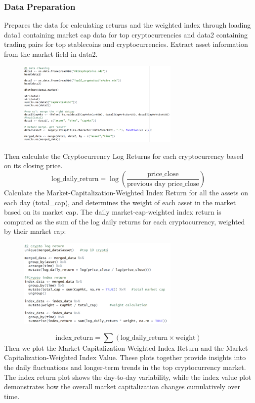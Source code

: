 \documentclass{article}
\begin{document}
\subsubsection{Data Preparation}
Prepares the data for calculating returns and the weighted index through loading data1 containing market cap data for top cryptocurrencies and data2 containing trading pairs for top stablecoins and cryptocurrencies. Extract asset information from the market field in data2.

\begin{figure}[h]
    \centering
    \includegraphics[width=0.7\textwidth]{2.png}
    \label{fig:example}
\end{figure}
Then calculate the Cryptocurrency Log Returns for each cryptocurrency based on its closing price.
\[
\text{log\_daily\_return} = \log\left(\frac{\text{price\_close}}{\text{previous day price\_close}}\right)
\]
Calculate the Market-Capitalization-Weighted Index Return for all the assets on each day (total\_cap), and determines the weight of each asset in the market based on its market cap.
The daily market-cap-weighted index return is computed as the sum of the log daily returns for each cryptocurrency, weighted by their market cap:
\begin{figure}[h]
    \centering
    \includegraphics[width=0.7\textwidth]{3.png}
    \label{fig:example}
\end{figure}
\[
\text{index\_return} = \sum (\text{log\_daily\_return} \times \text{weight})
\]
Then we plot the Market-Capitalization-Weighted Index Return and the Market-Capitalization-Weighted Index Value. These plots together provide insights into the daily fluctuations and longer-term trends in the top cryptocurrency market. The index return plot shows the day-to-day variability, while the index value plot demonstrates how the overall market capitalization changes cumulatively over time.
\end{document}

